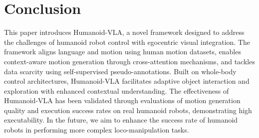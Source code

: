 \section{Conclusion}
This paper introduces Humanoid-VLA, a novel framework designed to address the challenges of humanoid robot control with egocentric visual integration. The framework aligns language and motion using human motion datasets, enables context-aware motion generation through cross-attention mechanisms, and tackles data scarcity using self-supervised pseudo-annotations. Built on whole-body control architectures, Humanoid-VLA facilitates adaptive object interaction and exploration with enhanced contextual understanding.
The effectiveness of Humanoid-VLA has been validated through evaluations of motion generation quality and execution success rates on real humanoid robots, demonstrating high executability. In the future, we aim to enhance the success rate of humanoid robots in performing more complex loco-manipulation tasks.

